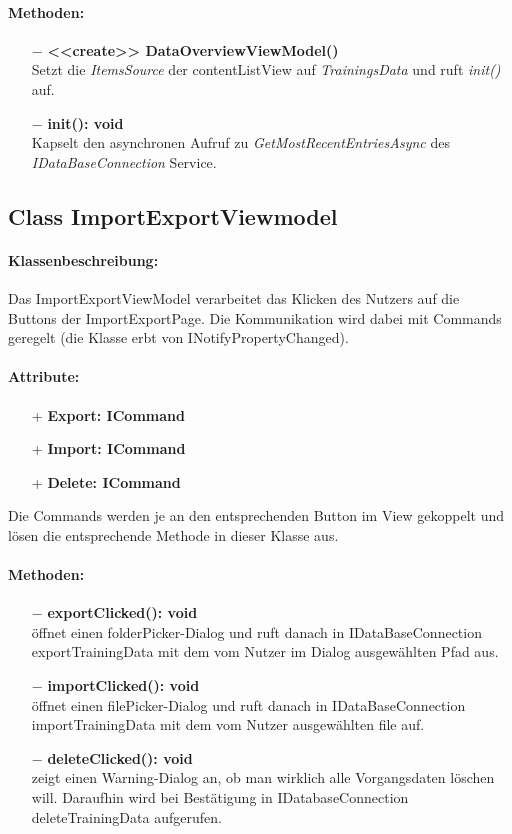 \documentclass[a4paper,12pt]{article}
\begin{document}
\paragraph{Methoden:}
\begin{itemize}
    \item[$-$] \textbf{<<create>> DataOverviewViewModel()} \\ Setzt die \textit{ItemsSource} der contentListView auf \textit{TrainingsData} und ruft \textit{init()} auf.
    \item[$-$] \textbf{init(): void} \\ Kapselt den asynchronen Aufruf zu \textit{GetMostRecentEntriesAsync} des \textit{IDataBaseConnection} Service.
\end{itemize} 

\subsection{Class ImportExportViewmodel}

\paragraph{Klassenbeschreibung:}
Das ImportExportViewModel verarbeitet das Klicken des Nutzers auf die Buttons  der ImportExportPage.
Die Kommunikation wird dabei mit Commands geregelt (die Klasse erbt von INotifyPropertyChanged).
\paragraph{Attribute:}
\begin{itemize}
	\item[+] \textbf{Export: ICommand}
	\item[+] \textbf{Import: ICommand}
	\item[+] \textbf{Delete: ICommand}
\end{itemize}
Die Commands werden je an den entsprechenden Button im View gekoppelt und lösen die entsprechende Methode in dieser Klasse aus.
\paragraph{Methoden:}
\begin{itemize}
    \item[$-$] \textbf{exportClicked(): void}\\ öffnet einen folderPicker-Dialog und ruft danach in IDataBaseConnection exportTrainingData mit dem vom Nutzer im Dialog ausgewählten Pfad aus.%
    \item[$-$] \textbf{importClicked(): void}\\ öffnet einen filePicker-Dialog und ruft danach in IDataBaseConnection importTrainingData mit dem vom Nutzer ausgewählten file auf.
    \item[$-$] \textbf{deleteClicked(): void}\\zeigt einen Warning-Dialog an, ob man wirklich alle Vorgangsdaten löschen will. Daraufhin wird bei Bestätigung in IDatabaseConnection deleteTrainingData aufgerufen.
\end{itemize} 
\end{document}
